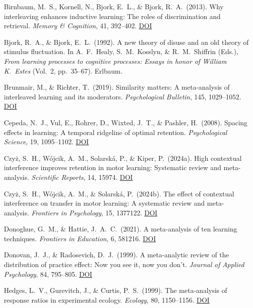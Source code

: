 \documentclass[10pt,twocolumn]{article}
\begin{document}
\noindent Birnbaum, M.\ S., Kornell, N., Bjork, E.\ L., \& Bjork, R.\ A.\ (2013). Why interleaving enhances inductive learning: The roles of discrimination and retrieval. \textit{Memory \& Cognition}, 41, 392--402. \href{https://doi.org/10.3758/s13421-012-0272-7}{DOI}

\noindent Bjork, R.\ A., \& Bjork, E.\ L.\ (1992). A new theory of disuse and an old theory of stimulus fluctuation. In A.\ F.\ Healy, S.\ M.\ Kosslyn, \& R.\ M.\ Shiffrin (Eds.), \textit{From learning processes to cognitive processes: Essays in honor of William K.\ Estes} (Vol.\ 2, pp.\ 35--67). Erlbaum.

\noindent Brunmair, M., \& Richter, T.\ (2019). Similarity matters: A meta-analysis of interleaved learning and its moderators. \textit{Psychological Bulletin}, 145, 1029--1052. \href{https://doi.org/10.1037/bul0000209}{DOI}

\noindent Cepeda, N.\ J., Vul, E., Rohrer, D., Wixted, J.\ T., \& Pashler, H.\ (2008). Spacing effects in learning: A temporal ridgeline of optimal retention. \textit{Psychological Science}, 19, 1095--1102. \href{https://doi.org/10.1111/j.1467-9280.2008.02209.x}{DOI}

\noindent Czy\.{z}, S.\ H., W\'{o}jcik, A.\ M., Solarsk\'{a}, P., \& Kiper, P.\ (2024a). High contextual interference improves retention in motor learning: Systematic review and meta-analysis. \textit{Scientific Reports}, 14, 15974. \href{https://doi.org/10.1038/s41598-024-65753-3}{DOI}

\noindent Czy\.{z}, S.\ H., W\'{o}jcik, A.\ M., \& Solarsk\'{a}, P.\ (2024b). The effect of contextual interference on transfer in motor learning: A systematic review and meta-analysis. \textit{Frontiers in Psychology}, 15, 1377122. \href{https://doi.org/10.3389/fpsyg.2024.1377122}{DOI}

\noindent Donoghue, G.\ M., \& Hattie, J.\ A.\ C.\ (2021). A meta-analysis of ten learning techniques. \textit{Frontiers in Education}, 6, 581216. \href{https://doi.org/10.3389/feduc.2021.581216}{DOI}

\noindent Donovan, J.\ J., \& Radosevich, D.\ J.\ (1999). A meta-analytic review of the distribution of practice effect: Now you see it, now you don't. \textit{Journal of Applied Psychology}, 84, 795--805. \href{https://doi.org/10.1037/0021-9010.84.5.795}{DOI}

\noindent Hedges, L.\ V., Gurevitch, J., \& Curtis, P.\ S.\ (1999). The meta-analysis of response ratios in experimental ecology. \textit{Ecology}, 80, 1150--1156. \href{https://doi.org/10.1890/0012-9658(1999)080[1150:TMAORR]2.0.CO;2}{DOI}
\end{document}
